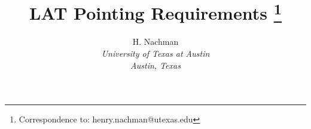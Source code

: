 \documentclass[11pt]{article}
\begin{document}

\title{LAT Pointing Requirements
\thanks{
Correspondence to:  henry.nachman@utexas.edu}
}


\author{H. Nachman\\
{\it  University of Texas at Austin}\\
{\it Austin, Texas}\\
 }


% 
% 

\pagebreak













\pagebreak
% 
\end{document}
